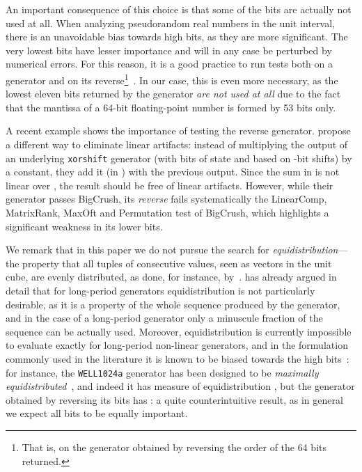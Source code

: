 \documentclass{acmsmalltr}
\newcommand{\xorshift}[1][]{\texttt{xorshift#1}\xspace}
\newcommand{\wella}{\texttt{WELL1024a}\xspace}
\begin{document}
An important consequence of this choice is that some of the bits are actually
not used at all. When analyzing pseudorandom real numbers in the unit interval,
there is an unavoidable bias towards high bits, as they are more significant.
The very lowest bits have lesser importance and will in any case be perturbed by
numerical errors. For this reason, it is a good practice to run 
tests both on a generator and on its reverse\footnote{That is, on
the generator obtained by reversing the order of the 64 bits returned.}~\cite{PTVNR}.
In our case, this is even more necessary, as the lowest eleven bits returned by the generator \emph{are
not used at all} due to the fact that the mantissa of a 64-bit floating-point
number is formed by 53 bits only.  

A recent example shows the importance of testing the reverse generator. 
 propose a different way to eliminate linear artifacts: instead of multiplying the
output of an underlying \xorshift generator (with  bits of state and based on -bit shifts) by a
constant, they add it (in ) with the previous output. Since the sum
in  is not linear over , the result should be
free of linear artifacts.
However, while their generator passes BigCrush, its \emph{reverse} fails
systematically the LinearComp, MatrixRank, MaxOft and Permutation test of
BigCrush, which highlights a significant weakness in its lower bits.

We remark that in this paper we do not pursue the search for
\emph{equidistribution}---the property that all tuples of consecutive values,
seen as vectors in the unit cube, are evenly distributed, as done, for instance,
by~.
 has already argued in detail that for long-period generators
equidistribution is not particularly desirable, as it is a property of the whole
sequence produced by the generator, and in the case of a long-period generator
only a minuscule fraction of the sequence can be actually used.
Moreover, equidistribution is currently impossible to evaluate exactly for
long-period non-linear generators, and in the formulation commonly used in the
literature it is known to be biased towards the high bits~\cite{LEPFRNG}: for
instance, the \wella generator has been designed to be \emph{maximally equidistributed}~\cite{PLMILPGBLRM2}, and indeed it has measure
of equidistribution , but the generator obtained by reversing its
bits has : a quite counterintuitive result, as in general we
expect all bits to be equally important.
\end{document}
